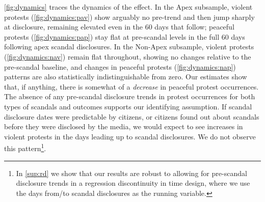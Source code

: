\documentclass[11pt]{article}
\begin{document}
\autoref{fig:dynamics} traces the dynamics of the effect. In the Apex subsample, violent protests (\autoref{fig:dynamics:pav}) show arguably no pre-trend and then jump sharply at disclosure, remaining elevated even in the 60 days that follow; peaceful protests (\autoref{fig:dynamics:pap}) stay flat at pre-scandal levels in the full 60 days following apex scandal disclosures. In the Non-Apex subsample, violent protests (\autoref{fig:dynamics:nav}) remain flat throughout, showing no changes relative to the pre-scandal baseline, and changes in peaceful protests (\autoref{fig:dynamics:nap}) patterns are also statistically indistinguishable from zero. Our estimates show that, if anything, there is somewhat of a \textit{decrease} in peaceful protest occurrences. The absence of any pre-scandal disclosure trends in protest occurrences for both types of scandals and outcomes supports our identifying assumption. If scandal disclosure dates were predictable by citizens, or citizens found out about scandals before they were disclosed by the media, we would expect to see increases in violent protests in the days leading up to scandal disclosures. We do not observe this pattern\footnote{In \autoref{sup:rd} we show that our results are robust to allowing for pre-scandal disclosure trends in a regression discontinuity in time design, where we use the days from/to scandal disclosures as the running variable.}.
\end{document}
